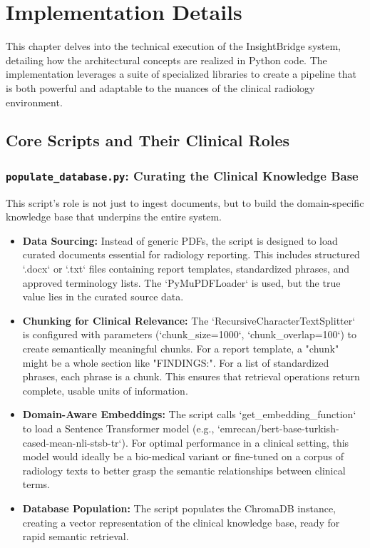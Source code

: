 \chapter{Implementation Details}
\label{cha:implementation}

This chapter delves into the technical execution of the InsightBridge system, detailing how the architectural concepts are realized in Python code. The implementation leverages a suite of specialized libraries to create a pipeline that is both powerful and adaptable to the nuances of the clinical radiology environment.

\section{Core Scripts and Their Clinical Roles}

\subsection{\texttt{populate\_database.py}: Curating the Clinical Knowledge Base}
This script's role is not just to ingest documents, but to build the domain-specific knowledge base that underpins the entire system.
\begin{itemize}
    \item \textbf{Data Sourcing:} Instead of generic PDFs, the script is designed to load curated documents essential for radiology reporting. This includes structured `.docx` or `.txt` files containing report templates, standardized phrases, and approved terminology lists. The `PyMuPDFLoader` is used, but the true value lies in the curated source data.
    \item \textbf{Chunking for Clinical Relevance:} The `RecursiveCharacterTextSplitter` is configured with parameters (`chunk\_size=1000`, `chunk\_overlap=100`) to create semantically meaningful chunks. For a report template, a "chunk" might be a whole section like "FINDINGS:". For a list of standardized phrases, each phrase is a chunk. This ensures that retrieval operations return complete, usable units of information.
    \item \textbf{Domain-Aware Embeddings:} The script calls `get\_embedding\_function` to load a Sentence Transformer model (e.g., `emrecan/bert-base-turkish-cased-mean-nli-stsb-tr`). For optimal performance in a clinical setting, this model would ideally be a bio-medical variant or fine-tuned on a corpus of radiology texts to better grasp the semantic relationships between clinical terms.
    \item \textbf{Database Population:} The script populates the ChromaDB instance, creating a vector representation of the clinical knowledge base, ready for rapid semantic retrieval.
\end{itemize}

